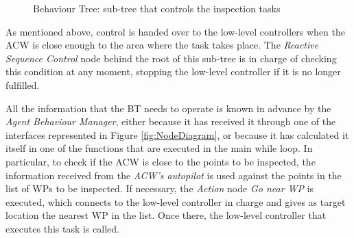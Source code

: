 \documentclass[fontsize=11pt, English=false, Español=true, Myfinal=true, twoside, numbers=noenddot]{scrbook}
\begin{document}
{\begin{figure}[ht]
\begin{center}
{}
		\caption{Behaviour Tree: sub-tree that controls the inspection tasks}
		\label{fig:InspectTree}
	\end{center}
\end{figure}

As mentioned above, control is handed over to the low-level controllers when the \gls{ACW} is close enough to the area where the task takes place. The \emph{Reactive Sequence Control} node behind the root of this sub-tree is in charge of checking this condition at any moment, stopping the low-level controller if it is no longer fulfilled.

All the information that the \gls{BT} needs to operate is known in advance by the \emph{Agent Behaviour Manager}, either because it has received it through one of the interfaces represented in Figure \ref{fig:NodeDiagram}, or because it has calculated it itself in one of the functions that are executed in the main while loop. In particular, to check if the \gls{ACW} is close to the points to be inspected, the information received from the \emph{\gls{ACW}'s autopilot} is used against the points in the list of \glspl{WP} to be inspected. If necessary, the \emph{Action} node \emph{Go near \gls{WP}} is executed, which connects to the low-level controller in charge and gives as target location the nearest \gls{WP} in the list. Once there, the low-level controller that executes this task is called.

}
\end{document}
